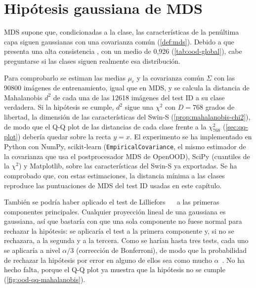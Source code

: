 \section{Hipótesis gaussiana de MDS}\label{sec:ood-mds-gaussiana}


MDS supone que, condicionadas a la clase, las características de la penúltima capa siguen gaussianas con una covarianza común (\cref{def:mds}). 
Debido a que presenta una alta consistencia , con un \AUROC medio de 0,926 (\cref{tab:ood-global}), cabe preguntarse si las clases siguen realmente esa distribución.

Para comprobarlo se estiman las medias $\mu_c$ y la covarianza común $\Sigma$ con las \num{90800} imágenes de entrenamiento, igual que en MDS, y se calcula la distancia de Mahalanobis $d^2$ de cada una de las \num{12618} imágenes del test ID a su clase verdadera. Si la hipótesis se cumple, $d^2$ sigue una $\chi^2$ con $D = 768$ grados de libertad, la dimensión de las características del Swin-S (\cref{prop:mahalanobis-chi2}), de modo que el Q-Q plot de las distancias de cada clase frente a la $\chi^2_{768}$ (\cref{sec:qq-plot}) debería quedar sobre la recta $y = x$. El experimento se ha implementado en Python con NumPy, scikit-learn (\texttt{EmpiricalCovariance}, el mismo estimador de la covarianza que usa el postprocesador MDS de OpenOOD), SciPy (cuantiles de la $\chi^2$) y Matplotlib, sobre las características del Swin-S ya exportadas. Se ha comprobado que, con estas estimaciones, la distancia mínima a las clases reproduce las puntuaciones de MDS del test ID usadas en este capítulo.

También se podría haber aplicado el test de Lilliefors~\cite{lilliefors1967} ~\cite{perez2025inferencia} a las primeras componentes principales. Cualquier proyección lineal de una gaussiana es gaussiana, así que bastaría con que una sola componente no fuese normal para rechazar la hipótesis: se aplicaría el test a la primera componente y, si no se rechazara, a la segunda y a la tercera. Como se harían hasta tres tests, cada uno se aplicaría a nivel $\alpha/3$ (corrección de Bonferroni), de modo que la probabilidad de rechazar la hipótesis por error en alguno de ellos sea como mucho $\alpha$~\cite[ec.~(4)]{dunn1961}. No ha hecho falta, porque el Q-Q plot ya muestra que la hipótesis no se cumple (\cref{fig:ood-qq-mahalanobis}).

